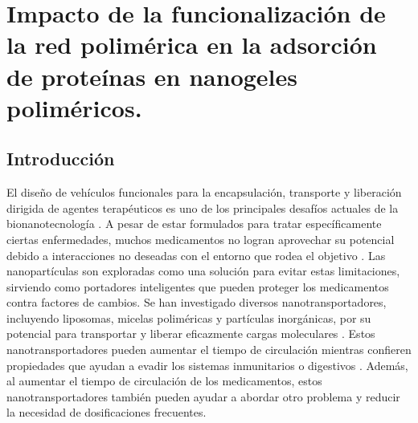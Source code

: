 \chapter{Impacto de la funcionalizaci\'on de la red polim\'erica en la adsorci\'on de prote\'inas en nanogeles polim\'ericos.}
\label{Chapter-esfericas}
\section{Introducci\'on}




El dise\~no de veh\'iculos funcionales para la encapsulaci\'on, transporte y liberaci\'on dirigida de agentes terap\'euticos es uno de los principales desaf\'ios  actuales de la bionanotecnolog\'ia \cite{ye2018review}.
A pesar de estar formulados para tratar espec\'ificamente ciertas enfermedades, muchos medicamentos no logran aprovechar su potencial debido a interacciones no deseadas con el entorno que rodea el objetivo \cite{ibraheem2014administration}.
Las nanopart\'iculas son exploradas como una soluci\'on para evitar estas limitaciones, sirviendo como portadores inteligentes que pueden proteger los medicamentos contra factores de cambios. %
Se han investigado diversos nanotransportadores, incluyendo liposomas, micelas polim\'ericas y part\'iculas inorg\'anicas, por su potencial para transportar y liberar eficazmente cargas moleculares \cite{chamundeeswari2019nanocarriers, lopez2012organic}.
Estos nanotransportadores pueden aumentar el tiempo de circulaci\'on mientras confieren propiedades que ayudan a evadir los sistemas inmunitarios o digestivos \cite{gaucher2010polymeric}.
Adem\'as, al aumentar el tiempo de circulaci\'on de los medicamentos, estos nanotransportadores tambi\'en pueden ayudar a abordar otro problema y reducir la necesidad de dosificaciones frecuentes.


